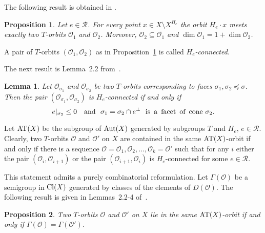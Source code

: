 \documentclass[12pt,a4paper]{amsart}
\theoremstyle{plain}
\newtheorem{lemma}{Lemma}
\newtheorem{proposition}{Proposition}
\theoremstyle{definition}
\begin{document}
The following result is obtained in \cite[Proposition~2.1]{AKZ}.

\begin{proposition} \label{prcon}
Let $e\in\mathcal{R}$. For every point $x\in X\setminus X^{H_e}$ the orbit
$H_e\cdot x$ meets exactly two $T$-orbits ${{\mathcal{O}}}_1$ and ${{\mathcal{O}}}_2$. Moreover, ${{\mathcal{O}}}_2\subseteq\overline{{{\mathcal{O}}}_1}$ and $\dim{{\mathcal{O}}}_1 = 1 + \dim{{\mathcal{O}}}_2$.
\end{proposition}

A pair of $T$-orbits $({{\mathcal{O}}}_1,{{\mathcal{O}}}_2)$
as in Proposition~\ref{prcon} is called {\it $H_e$-connected}.

\smallskip

The next result is Lemma~2.2 from~\cite{AKZ}.

\begin{lemma} \label{lemcon}
Let ${{\mathcal{O}}}_{\sigma_1}$ and ${{\mathcal{O}}}_{\sigma_2}$ be two $T$-orbits
corresponding to faces $\sigma_1,\sigma_2\preceq\sigma$.
Then the pair $({{\mathcal{O}}}_{\sigma_1}, {{\mathcal{O}}}_{\sigma_2})$ is $H_e$-connected
if and only if
$$
e|_{\sigma_2} \le 0 \quad \text{and} \ \ \sigma_1=\sigma_2\cap e^{\perp} \ \
\text{is \! a \! facet \! of \! cone} \ \sigma_2.
$$
\end{lemma}

Let ${\mathop{\rm AT}}(X)$ be the subgroup of ${\mathop{\rm Aut}}(X)$ generated by subgroups $T$
and $H_e$, $e\in\mathcal{R}$.
Clearly, two $T$-orbits ${{\mathcal{O}}}$ and ${{\mathcal{O}}}'$ on $X$ are contained in the same ${\mathop{\rm AT}}(X)$-orbit
if and only if there is a sequence ${{\mathcal{O}}}={{\mathcal{O}}}_1, {{\mathcal{O}}}_2,\ldots,{{\mathcal{O}}}_k={{\mathcal{O}}}'$ such that
for any $i$ either the pair $({{\mathcal{O}}}_i,{{\mathcal{O}}}_{i+1})$ or the pair $({{\mathcal{O}}}_{i+1},{{\mathcal{O}}}_i)$
is $H_e$-connected for some $e\in\mathcal{R}$.

This statement admits a purely combinatorial reformulation. Let $\Gamma({{\mathcal{O}}})$ be
a semigroup in ${\mathop{\rm Cl}}(X)$ generated by classes of the elements of $D({{\mathcal{O}}})$.
The following result is given in Lemmas~2.2-4 of~\cite{Ba}.

\begin{proposition} \label{prat}
Two $T$-orbits ${{\mathcal{O}}}$ and ${{\mathcal{O}}}'$ on $X$ lie in the same ${\mathop{\rm AT}}(X)$-orbit
if and only if $\Gamma({{\mathcal{O}}})=\Gamma({{\mathcal{O}}}')$.
\end{proposition}
\end{document}
